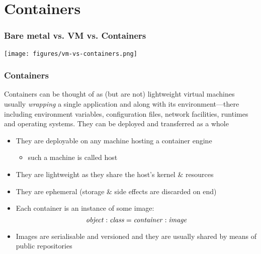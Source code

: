 \documentclass[presentation]{beamer}\mode<presentation>{\usetheme{AMSBolognaFC}}
\begin{document}
\section{Containers}

\begin{frame}
    \frametitle{Bare metal vs. VM vs. Containers}

    \begin{center}
        \texttt{[image: figures/vm-vs-containers.png]}
    \end{center}

\end{frame}

\begin{frame}
\frametitle{Containers}

    \begin{block}{}
        Containers
	can be thought of as (but \alert{are not})
	\alert{lightweight} virtual machines usually \emph{wrapping} a \alert{single application} and along with its \alert{environment}---there including environment variables, configuration files, network facilities, runtimes and operating systems. They can be deployed and transferred as a whole
    \end{block}
    \begin{itemize}
        \item They are deployable on any machine hosting a \alert{container engine}
        \begin{itemize}\small
            \item such a machine is called \alert{host}
        \end{itemize}

        \item They are \alert{lightweight} as they share the host's kernel \& resources

        \item They are \alert{ephemeral} (storage \& side effects are discarded on end)

        \item Each container is an instance of some \alert{image}:
        \begin{equation*}\small
            \mathit{object} : \mathit{class} = \mathit{container} : \mathit{image}
        \end{equation*}

        \item Images are serialisable and versioned and they are usually shared by means of public \alert{repositories}
    \end{itemize}

\end{frame}
\end{document}
